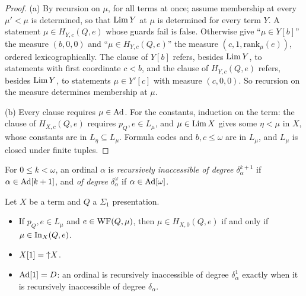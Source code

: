 \documentclass[11pt]{article}
\begin{document}
\begin{proof}
(a) By recursion on $\mu$, for all terms at once; assume membership at every $\mu' < \mu$ is determined, so that $\mathrm{Lim}\, Y$
at $\mu$ is determined for every term $Y$. A statement $\mu \in H_{Y,c}(Q,e)$ whose guards fail is false. Otherwise
give ``$\mu \in Y[b]$'' the measure $(b, 0, 0)$ and ``$\mu \in H_{Y,c}(Q,e)$'' the measure $(c, 1,
\mathrm{rank}_\mu(e))$, ordered lexicographically. The clause of $Y[b]$ refers, besides $\mathrm{Lim}\, Y$, to statements with
first coordinate $c < b$, and the clause of $H_{Y,c}(Q,e)$ refers, besides $\mathrm{Lim}\, Y$, to statements $\mu \in Y'[c]$ with
measure $(c, 0, 0)$. So recursion on the measure determines membership at $\mu$.

(b) Every clause requires $\mu \in \mathrm{Ad}$. For the constants, induction on the term: the clause of $H_{X,c}(Q,e)$ requires
$p_Q, e \in L_\mu$, and $\mu \in \mathrm{Lim}\, X$ gives some $\eta < \mu$ in $X$, whose constants are in $L_\eta \subseteq L_\mu$.
Formula codes and $b, c \le \omega$ are in $L_\mu$, and $L_\mu$ is closed under finite tuples.
\end{proof}

\begin{statement} For $0 \le k < \omega$, an ordinal $\alpha$ is \emph{recursively inaccessible of
degree $\delta_\alpha^{k+1}$} if $\alpha \in \mathrm{Ad}[k+1]$, and \emph{of degree $\delta_\alpha^\omega$} if $\alpha \in
\mathrm{Ad}[\omega]$.
\end{statement}

\begin{statement} Let $X$ be a term and $Q$ a $\Sigma_1$ presentation.
\begin{itemize}
\item[(a)] If $p_Q, e \in L_\mu$ and $e \in \mathrm{WF}(Q, \mu)$, then $\mu \in H_{X,0}(Q,e)$ if and only if $\mu \in
  \mathrm{In}_X(Q,e)$.
\item[(b)] $X[1] = {\uparrow} X$.
\item[(c)] $\mathrm{Ad}[1] = D$: an ordinal is recursively inaccessible of degree $\delta_\alpha^1$ exactly when it is
  recursively inaccessible of degree $\delta_\alpha$.
\end{itemize}
\end{statement}
\end{document}

